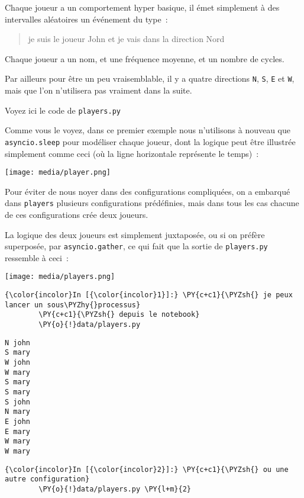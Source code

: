 Chaque joueur a un comportement hyper basique, il émet simplement à des
intervalles aléatoires un événement du type~:

\begin{quote}
je suis le joueur John et je vais dans la direction Nord
\end{quote}

Chaque joueur a un nom, et une fréquence moyenne, et un nombre de
cycles.

Par ailleurs pour être un peu vraisemblable, il y a quatre directions
\texttt{N}, \texttt{S}, \texttt{E} et \texttt{W}, mais que l'on
n'utilisera pas vraiment dans la suite.

    Voyez ici le code de \texttt{players.py}

    Comme vous le voyez, dans ce premier exemple nous n'utilisons à nouveau
que \texttt{asyncio.sleep} pour modéliser chaque joueur, dont la logique
peut être illustrée simplement comme ceci (où la ligne horizontale
représente le temps)~:

    \texttt{[image: media/player.png]}

    Pour éviter de nous noyer dans des configurations compliquées, on a
embarqué dans \texttt{players} plusieurs configurations prédéfinies,
mais dans tous les cas chacune de ces configurations crée deux joueurs.

    La logique des deux joueurs est simplement juxtaposée, ou si on préfère
superposée, par \texttt{asyncio.gather}, ce qui fait que la sortie de
\texttt{players.py} ressemble à ceci~:

    \texttt{[image: media/players.png]}

    \begin{Verbatim}[commandchars=\\\{\},frame=single,framerule=0.3mm,rulecolor=\color{cellframecolor}]
{\color{incolor}In [{\color{incolor}1}]:} \PY{c+c1}{\PYZsh{} je peux lancer un sous\PYZhy{}processus}
        \PY{c+c1}{\PYZsh{} depuis le notebook}
        \PY{o}{!}data/players.py
\end{Verbatim}


    \begin{Verbatim}[commandchars=\\\{\},frame=single,framerule=0.3mm,rulecolor=\color{cellframecolor}]
N john
S mary
W john
W mary
S mary
S mary
S john
N mary
E john
E mary
W mary
W mary
\end{Verbatim}

    \begin{Verbatim}[commandchars=\\\{\},frame=single,framerule=0.3mm,rulecolor=\color{cellframecolor}]
{\color{incolor}In [{\color{incolor}2}]:} \PY{c+c1}{\PYZsh{} ou une autre configuration}
        \PY{o}{!}data/players.py \PY{l+m}{2}
\end{Verbatim}


